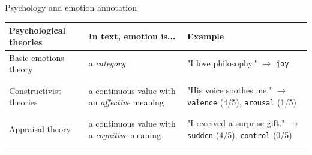 \documentclass[handout,10pt]{beamer}
\newcommand{\smallcitet}[2][]{\text{\scriptsize \citet[#1]{#2}}} %
\begin{document}
\begin{frame}{Psychology and emotion annotation}
{\small
\begin{center}
\begin{tabular}{p{6.5em}p{10.5em}p{13.5em}}
\textbf{Psychological theories} & \textbf{In text, emotion is...} & \textbf{Example} \\
\hline
\addlinespace
Basic emotions theory & a \textit{category} & "I love philosophy." $\rightarrow$ \texttt{joy} \\
\addlinespace
\smallcitet{darwin_expression_1872,tomkins_affect_1962,ekman_basic_1999,plutchik} & & \\
\smallcitet{demszky-etal-2020-goemotions,greschner2025categoricalemotionsappraisals} & & \\ 
\addlinespace
\hline
\addlinespace
\pause
Constructivist theories & a continuous value with an \textit{affective} meaning & "His voice soothes me." $\rightarrow$ \texttt{valence} (4/5), \texttt{arousal} (1/5) \\
\addlinespace
\smallcitet{schachter_cognitive_1962,russell_core_1999} & & \\
\smallcitet{buechel-hahn-2017-emobank} & & \\
\addlinespace
\hline
\addlinespace
\pause
Appraisal theory& a continuous value with a \textit{cognitive} meaning & "I received a surprise gift." $\rightarrow$ \texttt{sudden} (4/5), \texttt{control} (0/5) \\ 
\smallcitet{arnold_emotion_1960,lazarus_progress_1991}  & & \\
\smallcitet{Troiano2023} & & \\
\end{tabular}
\end{center}
}


\end{frame}
\end{document}
